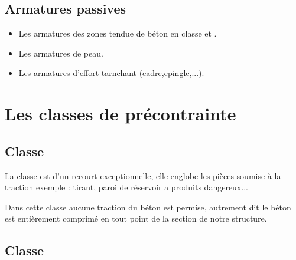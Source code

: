 \documentclass[12pt,a4paper]{article}
\newcommand{\RomanNum}[1] %
{\MakeUppercase{\romannumeral #1}}
\begin{document}
	
	\subsection{Armatures passives}
	
	\begin{itemize}
		\item Les armatures des zones tendue de béton en classe \RomanNum{2} et \RomanNum{3}.
		\item Les armatures de peau.
		\item Les armatures d'effort tarnchant (cadre,epingle,...).
	\end{itemize}
	
	\section{Les classes de précontrainte}
	
	\subsection{Classe \RomanNum{1}}
	
	La classe \RomanNum{1} est d'un recourt exceptionnelle, elle englobe les pièces soumise à la traction exemple : tirant, paroi de réservoir a produits dangereux...
	
	\vspace{\baselineskip}
	
	Dans cette classe aucune traction du béton est permise, autrement dit le béton est entièrement comprimé en tout point de la section de notre structure. 
	
	
	
	
	\subsection{Classe \RomanNum{2}}
	
\end{document}
